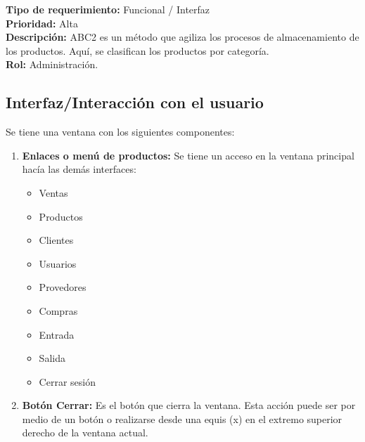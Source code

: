 \documentclass[a4paper,DIV=12]{scrreprt}
\begin{document}
\noindent

\textbf{Tipo de requerimiento:} Funcional / Interfaz\\
\textbf{Prioridad:} Alta\\
\textbf{Descripción:} ABC2 es un método que agiliza los procesos de almacenamiento de los productos. Aquí, se clasifican los productos por categoría.\\
\textbf{Rol:} Administración.
\subsection*{Interfaz/Interacción con el usuario}

Se tiene una ventana con los siguientes componentes: 


\begin{enumerate}
	\item{\textbf{Enlaces o menú de productos:} Se tiene un acceso en la ventana principal hacía las demás interfaces: }
	\begin{itemize}
	    \item Ventas
	    \item Productos
	    \item Clientes
	    \item Usuarios
	    \item Provedores
	    \item Compras
	    \item Entrada
	    \item Salida
	    \item Cerrar sesión 
	\end{itemize}

	\item{\textbf{Botón Cerrar:} Es el botón que cierra la ventana. Esta acción puede ser por medio de un botón o realizarse desde una equis (x) en el extremo superior derecho de la ventana actual.  }
\end{enumerate}
\end{document}

